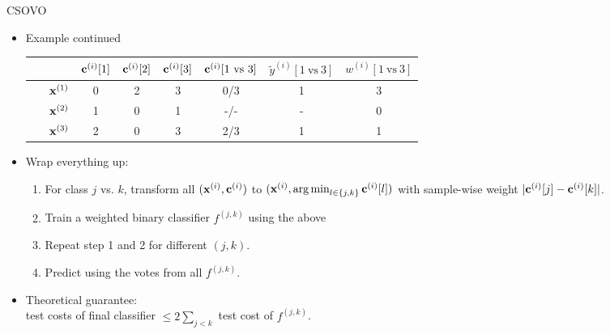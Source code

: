 \documentclass[11pt,compress,t,notes=noshow, xcolor=table]{beamer}
\begin{document}
\begin{vbframe}{CSOVO}
    \begin{itemize}
    \item Example continued
            \begin{center}  
            \footnotesize{
        \begin{tabular}{cc|ccc|ccc}\
        			& & $\mathbf{c}^{(i)}[1]$ & $\mathbf{c}^{(i)}[2]$ & $\mathbf{c}^{(i)}[3]$ & $\cv^{(i)}[1 \ \text{vs} \ 3]$ & $\tilde{y}^{( i)}[1 \ \text{vs} \ 3]$ & $w^{(i)}[1 \ \text{vs} \ 3]$\\
        			\hline & $\mathbf{x}^{(1)}$ & 0 & 2 & 3 & 0/3 & 1 & 3\\
        			& $\mathbf{x}^{(2)}$ & 1 & 0 & 1 & -/- & - & 0 \\
                 	& $\mathbf{x}^{(3)}$ & 2 & 0 & 3 & 2/3 & 1 & 1\\
                \end{tabular}
                }
    \end{center}
            \vspace{5pt}

    \item Wrap everything up:
    \begin{enumerate}
        \item For class $j$ vs. $k$, transform all $(\mathbf{x}^{(i)}, \mathbf{c}^{(i)})$ to $(\mathbf{x}^{(i)}, \operatorname{arg\,min}_{l \in \{j, k\}} \mathbf{c}^{(i)}[l])$ with sample-wise weight $|\mathbf{c}^{(i)}[j] - \mathbf{c}^{(i)}[k]|$.
        \vspace{5pt}
        
        \item Train a weighted binary classifier $f^{(j, k)}$ using the above
        \vspace{5pt}
        
        \item Repeat step 1 and 2 for different $(j, k)$.
        \vspace{5pt}
        
        \item Predict using the votes from all $f^{(j, k)}$.
    \end{enumerate}
    \vspace{5pt}

    \item Theoretical guarantee:\\ 
    test costs of final classifier $\leq 2\sum_{j < k}$ test cost of $f^{(j, k)}$. 
    \end{itemize}
\end{vbframe}
\end{document}
